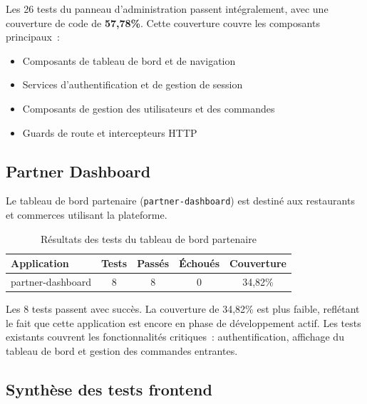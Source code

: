 Les 26 tests du panneau d'administration passent int\'{e}gralement, avec une
couverture de code de \textbf{57,78\%}. Cette couverture couvre les
composants principaux~:

\begin{itemize}[leftmargin=*]
  \item Composants de tableau de bord et de navigation
  \item Services d'authentification et de gestion de session
  \item Composants de gestion des utilisateurs et des commandes
  \item Guards de route et intercepteurs HTTP
\end{itemize}

\subsection{Partner Dashboard}

Le tableau de bord partenaire (\texttt{partner-dashboard}) est destin\'{e}
aux restaurants et commerces utilisant la plateforme.

\begin{table}[H]
\centering
\caption{R\'{e}sultats des tests du tableau de bord partenaire}
\label{tab:resultats-partner}
\begin{tabularx}{\textwidth}{|X|c|c|c|c|}
\hline
\rowcolor{speedlineBlue!10}
\textbf{Application} & \textbf{Tests} & \textbf{Pass\'{e}s} & \textbf{\'{E}chou\'{e}s} & \textbf{Couverture} \\
\hline
partner-dashboard & 8 & \textcolor{speedlineGreen}{8} & \textcolor{speedlineGreen}{0} & 34,82\% \\
\hline
\end{tabularx}
\end{table}

Les 8 tests passent avec succ\`{e}s. La couverture de 34,82\% est plus
faible, refl\'{e}tant le fait que cette application est encore en phase de
d\'{e}veloppement actif. Les tests existants couvrent les fonctionnalit\'{e}s
critiques~: authentification, affichage du tableau de bord et gestion
des commandes entrantes.

\subsection{Synth\`{e}se des tests frontend}

